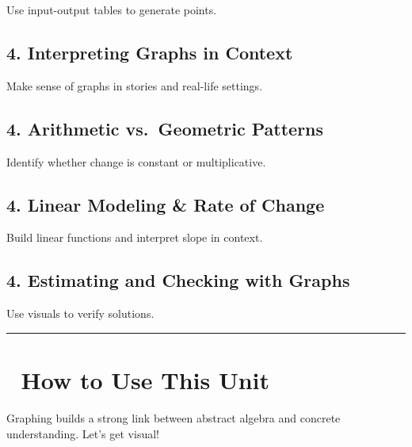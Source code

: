 \documentclass[
  letterpaper,
  DIV=11,
  numbers=noendperiod]{scrreprt}
\begin{document}
Use input-output tables to generate points.

\subsection*{4. Interpreting Graphs in
Context}\label{interpreting-graphs-in-context}

Make sense of graphs in stories and real-life settings.

\subsection*{4. Arithmetic vs.~Geometric
Patterns}\label{arithmetic-vs.-geometric-patterns}

Identify whether change is constant or multiplicative.

\subsection*{4. Linear Modeling \& Rate of
Change}\label{linear-modeling-rate-of-change}

Build linear functions and interpret slope in context.

\subsection*{4. Estimating and Checking with
Graphs}\label{estimating-and-checking-with-graphs}

Use visuals to verify solutions.

\begin{center}\rule{0.5\linewidth}{0.5pt}\end{center}

\section*{🧭 How to Use This Unit}\label{how-to-use-this-unit-1}


Graphing builds a strong link between abstract algebra and concrete
understanding. Let's get visual!
\end{document}
